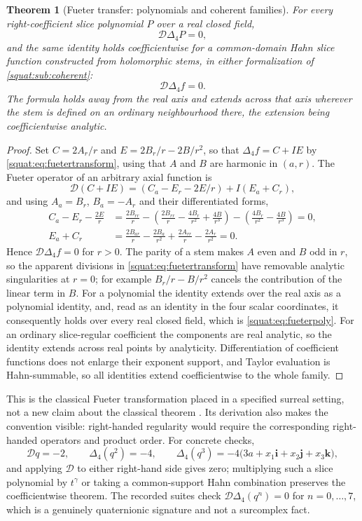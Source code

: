 \documentclass[11pt,letterpaper]{article}
\numberwithin{equation}{section}
\newtheorem{theorem}{Theorem}[section]
\theoremstyle{definition}
\theoremstyle{remark}
\newcommand{\ii}{\mathbf i}
\newcommand{\jj}{\mathbf j}
\newcommand{\kk}{\mathbf k}
\newcommand{\DD}{\mathcal D}
\begin{document}
\begin{theorem}[Fueter transfer: polynomials and coherent families]\label{squat:thm:fueter}
For every right-coefficient slice polynomial $P$ over a real closed field,
\begin{equation}\label{squat:eq:fueterpoly}
 \DD\Delta_4P=0,
\end{equation}
and the same identity holds coefficientwise for a common-domain Hahn slice function
constructed from holomorphic stems, in either formalization of
\cref{squat:sub:coherent}:
\begin{equation}\label{squat:eq:fuetertheorem}
 \DD\Delta_4f=0 .
\end{equation}
The formula holds away from the real axis and extends across that axis wherever the stem is
defined on an ordinary neighbourhood there, the extension being coefficientwise analytic.
\end{theorem}
\begin{proof}
Set $C=2A_r/r$ and $E=2B_r/r-2B/r^2$, so that $\Delta_4f=C+IE$ by
\cref{squat:eq:fuetertransform}, using that $A$ and $B$ are harmonic in $(a,r)$. The Fueter
operator of an arbitrary axial function is
\[
 \DD(C+IE)=(C_a-E_r-2E/r)+I(E_a+C_r),
\]
and using $A_a=B_r$, $B_a=-A_r$ and their differentiated forms,
\begin{align*}
 C_a-E_r-\frac{2E}{r}
 &=\frac{2B_{rr}}r-\left(\frac{2B_{rr}}r-\frac{4B_r}{r^2}+\frac{4B}{r^3}\right)
   -\left(\frac{4B_r}{r^2}-\frac{4B}{r^3}\right)=0,\\
 E_a+C_r&=\frac{2B_{ar}}r-\frac{2B_a}{r^2}+\frac{2A_{rr}}r-\frac{2A_r}{r^2}=0 .
\end{align*}
Hence $\DD\Delta_4f=0$ for $r>0$. The parity of a stem makes $A$ even and $B$ odd in $r$,
so the apparent divisions in \cref{squat:eq:fuetertransform} have removable analytic
singularities at $r=0$; for example $B_r/r-B/r^2$ cancels the contribution of the linear
term in $B$. For a polynomial the identity extends over the real axis as a polynomial
identity, and, read as an identity in the four scalar coordinates, it consequently holds
over every real closed field, which is \cref{squat:eq:fueterpoly}. For an ordinary
slice-regular coefficient the components are real analytic, so the identity extends across
real points by analyticity. Differentiation of coefficient functions does not enlarge their
exponent support, and Taylor evaluation is Hahn-summable, so all identities extend
coefficientwise to the whole family.
\end{proof}

This is the classical Fueter transformation placed in a specified surreal setting, not a
new claim about the classical theorem \cite{GP}. Its derivation also makes the convention
visible: right-handed regularity would require the corresponding right-handed operators and
product order. For concrete checks,
\[
 \DD q=-2,\qquad \Delta_4(q^2)=-4,\qquad
 \Delta_4(q^3)=-4\bigl(3a+x_1\ii+x_2\jj+x_3\kk\bigr),
\]
and applying $\DD$ to either right-hand side gives zero; multiplying such a slice
polynomial by $t^\gamma$ or taking a common-support Hahn combination preserves the
coefficientwise theorem. The recorded suites check $\DD\Delta_4(q^n)=0$ for
$n=0,\ldots,7$, which is a genuinely quaternionic signature and not a surcomplex fact.
\end{document}
